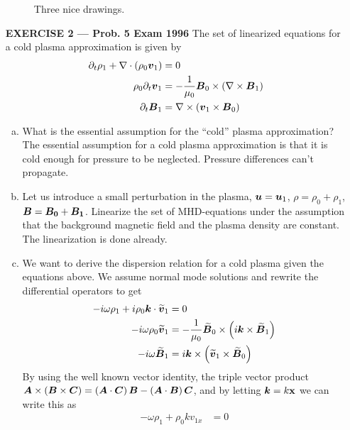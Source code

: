 \begin{enumerate}
\begin{figure}[t]
        \caption{Three nice drawings.}\label{fig:L7_ex1}
    \end{figure}
    \item [\textbf{EXERCISE 2 --- Prob. 5 Exam 1996}] The set of linearized equations for a cold plasma approximation is given by
    \begin{align*}
        \partial_{t}\rho_1+\nabla\cdot\left(\rho_0 \boldsymbol{v}_1\right)&=0\\
        \rho_0\partial_{t}\boldsymbol{v}_1&=-\frac{1}{\mu_0}\boldsymbol{B}_0\times\left(\nabla\times\boldsymbol{B}_1\right)\\
        \partial_{t}\boldsymbol{B}_1&=\nabla\times\left(\boldsymbol{v}_1\times\boldsymbol{B}_0\right)
    \end{align*}
    \begin{enumerate}[(a)]
        \item What is the essential assumption for the ``cold'' plasma approximation?
        \mylinbrk{}
        The essential assumption for a cold plasma approximation is that it is cold enough for pressure to be neglected. Pressure differences can't propagate.
        \item Let us introduce a small perturbation in the plasma, \(\boldsymbol{u}=\boldsymbol{u}_1\), \(\rho=\rho_0+\rho_1\), \(\boldsymbol{B}=\boldsymbol{B_0}+\boldsymbol{B_1}\). Linearize the set of MHD-equations under the assumption that the background magnetic field and the plasma density are constant.
        \mylinbrk{}
        The linearization is done already.
        \item We want to derive the dispersion relation for a cold plasma given the equations above. We assume normal mode solutions and rewrite the differential operators to get
        \begin{align*}
            -i\omega\rho_1+i\rho_0\boldsymbol{k}\cdot\boldsymbol{\widetilde{v}}_1&=0\\
            -i\omega\rho_0\boldsymbol{\widetilde{v}}_1&=-\frac{1}{\mu_0}\boldsymbol{\widetilde{B}}_0\times\left(i\boldsymbol{k}\times\boldsymbol{\widetilde{B}}_1\right)\\
            -i\omega\boldsymbol{\widetilde{B}}_1&=i\boldsymbol{k}\times\left(\boldsymbol{\widetilde{v}}_1\times\boldsymbol{\widetilde{B}}_0\right)
        \end{align*}
        By using the well known vector identity, the triple vector product \(\boldsymbol{A}\times\left(\boldsymbol{B}\times\boldsymbol{C}\right)=\left(\boldsymbol{A}\cdot\boldsymbol{C}\right)\boldsymbol{B}-\left(\boldsymbol{A}\cdot\boldsymbol{B}\right)\boldsymbol{C}\), and by letting \(\boldsymbol{k}=k\mathbf{x}\) we can write this as
        \begin{align}
            -\omega\rho_1+\rho_0kv_{1x}&=0\label{eq:L7_alfven_normalmode1}\\

\end{align}
\end{enumerate}
\end{enumerate}
